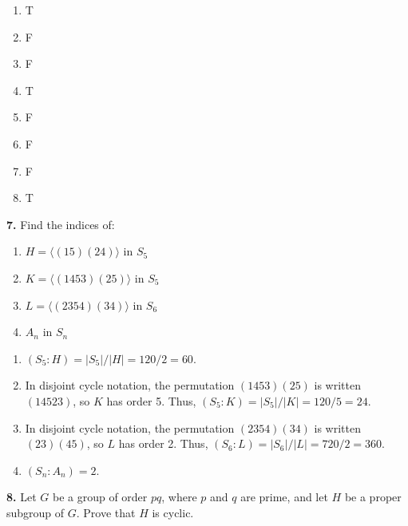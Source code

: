 \documentclass[10pt,]{book}
\theoremstyle{plain}
\theoremstyle{definition}
\theoremstyle{definition}
\theoremstyle{definition}
\theoremstyle{definition}
\numberwithin{equation}{section}
\begin{document}
\par\smallskip
\leavevmode%
\begin{multicols}{4}
\begin{enumerate}[label=(\alph*)]
\item\hypertarget{li-469}{}
          T
\item\hypertarget{li-470}{}
          F
\item\hypertarget{li-471}{}
          F
\item\hypertarget{li-472}{}
          T
\item\hypertarget{li-473}{}
          F
\item\hypertarget{li-474}{}
          F
\item\hypertarget{li-475}{}
          F
\item\hypertarget{li-476}{}
          T
\end{enumerate}
\end{multicols}
\par\smallskip
\noindent\textbf{7.}\quad{}
        Find the indices of:
        \leavevmode%
\begin{enumerate}[label=(\alph*)]
\item\hypertarget{li-477}{}
              \(H=\langle (15)(24)\rangle\) in \(S_5\)
\item\hypertarget{li-478}{}
              \(K=\langle (1453)(25)\rangle\) in \(S_5\)
\item\hypertarget{li-479}{}
              \(L=\langle (2354)(34)\rangle\) in \(S_6\)
\item\hypertarget{li-480}{}
              \(A_n\) in \(S_n\)
\end{enumerate}

\par\smallskip
\leavevmode%
\begin{enumerate}[label=(\alph*)]
\item\hypertarget{li-481}{}
          \((S_5:H)=|S_5|/|H|=120/2=60.\)
\item\hypertarget{li-482}{}
          In disjoint cycle notation, the permutation \((1453)(25)\) is written \((14523)\), so \(K\) has order 5. Thus, \((S_5:K)=|S_5|/|K|=120/5=24.\)
\item\hypertarget{li-483}{}
          In disjoint cycle notation, the permutation \((2354)(34)\) is written \((23)(45)\), so \(L\) has order 2. Thus, \((S_6:L)=|S_6|/|L|=720/2=360.\)
\item\hypertarget{li-484}{}
          \((S_n:A_n)=2\).
\end{enumerate}
\par\smallskip
\noindent\textbf{8.}\quad{}
        Let \(G\) be a group of order \(pq\), where \(p\)
        and \(q\) are prime, and let \(H\) be a proper subgroup of
        \(G\). Prove that \(H\) is cyclic.
\par\smallskip
\end{document}
